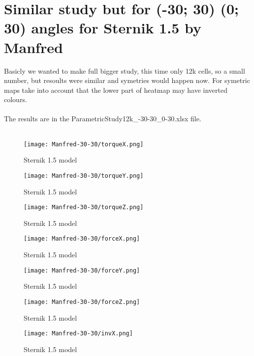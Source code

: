 \section{Similar study but for (-30; 30) (0; 30) angles for Sternik 1.5 by Manfred}
Basicly we wanted to make full bigger study, this time only 12k cells, so a small number, 
but resoults were similar and symetries would happen now. For symetric maps take into account
that the lower part of heatmap may have inverted colours. \\\\
The results are in the ParametricStudy12k\_-30-30\_0-30.xlsx file. \\\\

\begin{figure}[H]
    \centering
    \texttt{[image: Manfred-30-30/torqueX.png]}
    \caption{Sternik 1.5 model}
\end{figure}

\begin{figure}[H]
    \centering
    \texttt{[image: Manfred-30-30/torqueY.png]}
    \caption{Sternik 1.5 model}
\end{figure}

\begin{figure}[H]
    \centering
    \texttt{[image: Manfred-30-30/torqueZ.png]}
    \caption{Sternik 1.5 model}
\end{figure}

\begin{figure}[H]
    \centering
    \texttt{[image: Manfred-30-30/forceX.png]}
    \caption{Sternik 1.5 model}
\end{figure}

\begin{figure}[H]
    \centering
    \texttt{[image: Manfred-30-30/forceY.png]}
    \caption{Sternik 1.5 model}
\end{figure}

\begin{figure}[H]
    \centering
    \texttt{[image: Manfred-30-30/forceZ.png]}
    \caption{Sternik 1.5 model}
\end{figure}

\begin{figure}[H]
    \centering
    \texttt{[image: Manfred-30-30/invX.png]}
    \caption{Sternik 1.5 model}
\end{figure}

